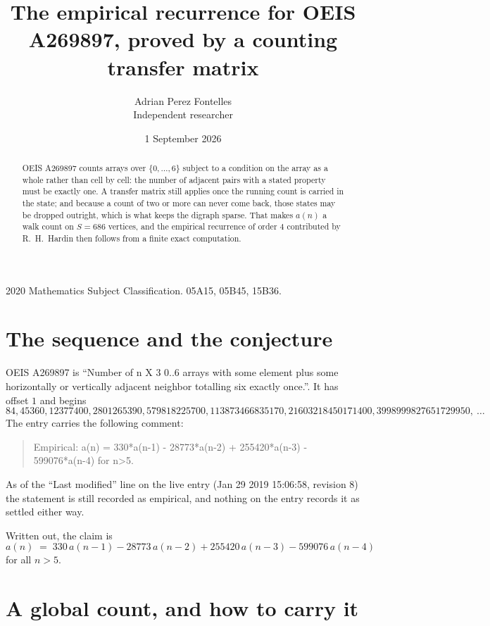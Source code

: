 \documentclass[11pt,a4paper]{article}
\title{The empirical recurrence for OEIS A269897, proved by a counting transfer matrix}
\author{Adrian Perez Fontelles\\ \small Independent researcher}
\date{1 September 2026}
\theoremstyle{plain}
\theoremstyle{definition}
\begin{document}
\maketitle

\begin{abstract}
OEIS A269897 counts arrays over $\{0,\dots,6\}$ subject to a condition on the array as a
whole rather than cell by cell: the number of adjacent pairs with a stated property must be
exactly one. A transfer matrix still applies once the running count is carried in the state; and
because a count of two or more can never come back, those states may be dropped outright,
which is what keeps the digraph sparse. That makes $a(n)$ a walk count on $S=686$ vertices,
and the empirical recurrence of order $4$ contributed by R.~H.~Hardin then follows from
a finite exact computation.
\end{abstract}

\noindent\small 2020 Mathematics Subject Classification. 05A15, 05B45, 15B36.\normalsize

\section{The sequence and the conjecture}

OEIS A269897 is ``Number of n X 3 0..6 arrays with some element plus some horizontally or vertically adjacent neighbor totalling six exactly once.''. It has offset $1$ and begins
\[
84, 45360, 12377400, 2801265390, 579818225700, 113873466835170, 21603218450171400, 3998999827651729950,\ \dots
\]
The entry carries the following comment:
\begin{quote}\small
Empirical: a(n) = 330*a(n-1) - 28773*a(n-2) + 255420*a(n-3) - 599076*a(n-4) for n>5.
\end{quote}
As of the ``Last modified'' line on the live entry (Jan 29 2019 15:06:58, revision 8) the statement is
still recorded as empirical, and nothing on the entry records it as settled either way.

Written out, the claim is
\begin{equation}\label{eq:conj}
a(n)\;=\;330\,a(n-1) - 28773\,a(n-2) + 255420\,a(n-3) - 599076\,a(n-4)
\end{equation}
for all $n>5$.

\section{A global count, and how to carry it}
\end{document}
